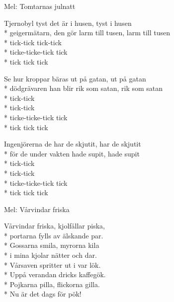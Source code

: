 \begin{SongText}[Geigervisan ]
    \begin{SongInfo}
        Mel: Tomtarnas julnatt
    \end{SongInfo}
    \begin{SongVerse}
        Tjernobyl tyst det är i husen, tyst i husen\\*%
        geigermätarn, den gör larm till tusen, larm till tusen\\*%
        tick-tick tick-tick\\*%
        ticke-ticke-tick tick\\*%
        tick tick tick
    \end{SongVerse}
    \begin{SongVerse}
        Se hur kroppar bäras ut på gatan, ut på gatan\\*%
        dödgrävaren han blir rik som satan, rik som satan\\*%
        tick-tick\\*%
        tick-tick\\*%
        ticke-ticke-tick tick\\*%
        tick tick tick
    \end{SongVerse}
    \begin{SongVerse}
        Ingenjörerna de har de skjutit, har de skjutit\\*%
        för de under vakten hade supit, hade supit\\*%
        tick-tick\\*%
        tick-tick\\*%
        ticke-ticke-tick tick\\*%
        tick tick tick
    \end{SongVerse}
\end{SongText}
\begin{SongText}[Pökvisa]
    \begin{SongInfo}
        Mel: Vårvindar friska
    \end{SongInfo}
    \begin{SongVerse}
        Vårvindar friska, kjolfållar piska,\\*%
        portarna fylls av älskande par.\\*%
        Gossarna smila, myrorna kila\\*%
        i mina kjolar nätter och dar.\\*%
        Vårsaven spritter ut i var lök.\\*%
        Uppå verandan dricks kaffegök.\\*%
        Pojkarna pilla, flickorna gilla.\\*%
        Nu är det dags för pök!
    \end{SongVerse}
\end{SongText}
